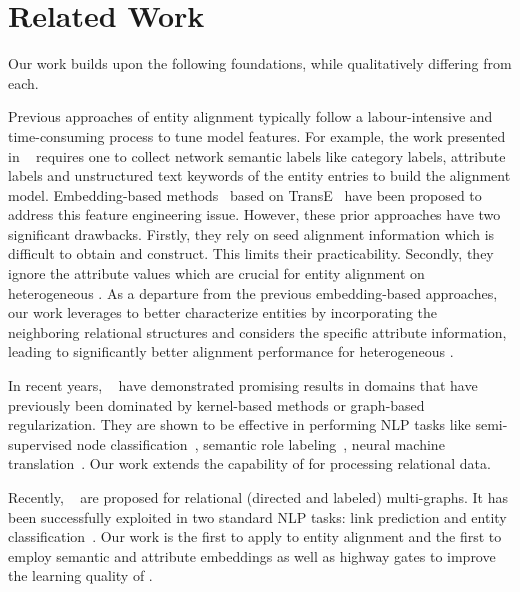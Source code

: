 
	
	\section{Related Work}
    Our work builds upon the following foundations, while qualitatively differing from each.

    	 Previous approaches of entity alignment typically
follow a labour-intensive and time-consuming process to tune model features. For example, the work presented in ~\cite{Wang2017} requires
one to collect network semantic labels like category labels, attribute labels and unstructured text keywords of the entity entries to build
the alignment model. Embedding-based methods~\cite{hao2016joint,chen2016multilingual,sun2017cross,zhu2017iterative} based on
TransE~\cite{bordes2013translating} have been proposed to address this feature engineering issue. However, these prior approaches have two
significant drawbacks. Firstly, they rely on seed alignment information which is difficult to obtain and construct. This limits their
practicability. Secondly, they ignore the attribute values which are crucial for entity alignment on heterogeneous \KGs. As a departure
from the previous embedding-based approaches, our work leverages \RGCNs to better characterize entities by incorporating the neighboring
relational structures and considers the specific attribute information, leading to significantly better alignment performance for
heterogeneous \KGs.

	 In recent years, \GCNs~\cite{Duvenaud2015Convolutional,Kearnes2016Molecular}
    have demonstrated promising results in domains that have previously been dominated by kernel-based methods or graph-based regularization.
    They are shown to be effective in performing NLP tasks like semi-supervised
    node classification~\cite{Kipf2016Semi}, semantic role labeling~\cite{Marcheggiani2017Encoding}, neural machine
    translation~\cite{Bastings2017Graph}. Our work extends the capability of \GCNs for processing relational data.


	Recently, \RGCNs~\cite{Schlichtkrull2017Modeling} are proposed  for relational (directed and labeled) multi-graphs. It has been
successfully exploited in two standard NLP tasks: link prediction and entity classification~\cite{Schlichtkrull2017Modeling}. Our work is
the first to apply \RGCNs to entity alignment and the first to employ semantic and attribute embeddings as well as highway gates to improve
the learning quality of \RGCNs.

